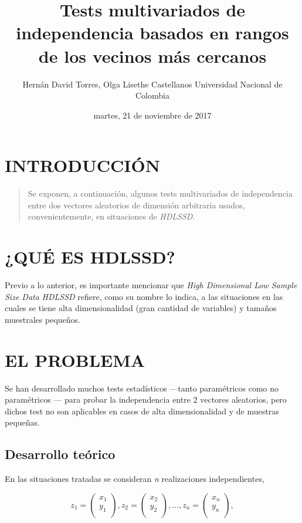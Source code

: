 \documentclass[]{book}
\title{Tests multivariados de independencia basados en rangos de los vecinos
más cercanos}
\author{Hernán David Torres, Olga Lisethe Castellanos Universidad Nacional de
Colombia}
\date{martes, 21 de noviembre de 2017}
\begin{document}
\maketitle

{
\setcounter{tocdepth}{1}
\tableofcontents
}
\chapter{INTRODUCCIÓN}\label{introduccion}

\begin{quote}
Se exponen, a continuación, algunos tests multivariados de independencia
entre dos vectores aleatorios de dimensión arbitraria usados,
convenientemente, en situaciones de \emph{\emph{HDLSSD}}.
\citep{sarkar2017some}
\end{quote}

\chapter{¿QUÉ ES HDLSSD?}\label{intro}

Previo a lo anterior, es importante mencionar que \emph{\emph{High
Dimensional Low Sample Size Data}} \emph{\emph{HDLSSD}} refiere, como su
nombre lo indica, a las situaciones en las cuales se tiene alta
dimensionalidad (gran cantidad de variables) y tamaños muestrales
pequeños.

\chapter{EL PROBLEMA}\label{el-problema}

Se han desarrollado muchos tests estadísticos ---tanto paramétricos como
no paramétricos --- para probar la independencia entre 2 vectores
aleatorios, pero dichos test no son aplicables en casos de alta
dimensionalidad y de muestras pequeñas.

\section{Desarrollo teórico}\label{desarrollo-teorico}

En las situaciones tratadas se consideran \emph{\emph{n}} realizaciones
independientes,

\[
 z_{1} =
\begin{pmatrix} x_1\\
y_1\\
\end{pmatrix} 
 ,  z_{2} =
\begin{pmatrix} x_2\\
y_2\\
\end{pmatrix}, ... ,    z_{n} =
\begin{pmatrix} x_n\\
y_n\\
\end{pmatrix},
\]
\end{document}
